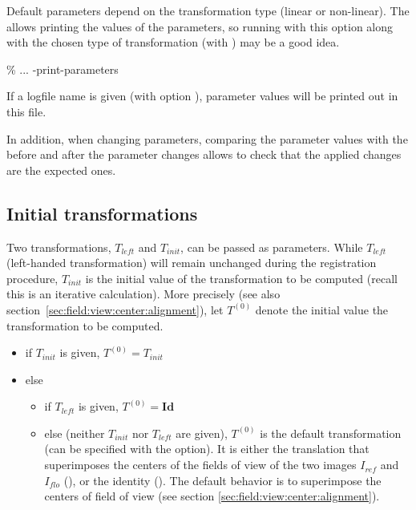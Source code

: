 \begin{attention} 
Default parameters depend on the transformation type (linear or non-linear). 
The  allows printing the values of the parameters, so running \blockmatching with this option along with the chosen type of transformation (with ) may be a good idea. 
\begin{code}{1}
\% \blockmatching ... -print-parameters
\end{code}
If a logfile name is given (with option ), parameter values will be printed out in this file.

In addition, when changing parameters, comparing the parameter values with the  before and after the parameter changes allows to check that the applied changes are the expected ones.
\end{attention}










\subsection{Initial transformations}
Two transformations, $T_{left}$ and $T_{init}$, can be passed
as parameters. While $T_{left}$ (left-handed transformation) will remain unchanged during the
registration procedure, $T_{init}$ is the initial value of the
transformation to be computed (recall this is an iterative
calculation). More precisely (see also section~\ref{sec:field:view:center:alignment}), let $T^{(0)}$ denote the initial value
the transformation to be computed.

\begin{itemize}
\item if $T_{init}$ is given, $T^{(0)} = T_{init}$ 
\item else 
\begin{itemize}
\item if $T_{left}$ is given, $T^{(0)}  = \mathbf{Id}$
\item else (neither $T_{init}$ nor $T_{left}$ are given), $T^{(0)}$ is the default transformation (can be specified with the  option). It is either the translation that superimposes the centers of the fields of view of the two images $I_{ref}$ and $I_{flo}$ (),  or the identity (). 
The default behavior is to superimpose the centers of field of view (see section \ref{sec:field:view:center:alignment}).
\end{itemize}
\end{itemize}

